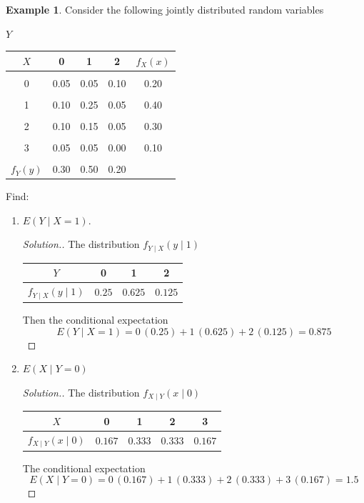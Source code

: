 \documentclass[12pt,a4paper]{report}
\theoremstyle{definition}
\newtheorem{example}[thm]{Example}
\theoremstyle{plain}
\theoremstyle{definition}
\begin{document}
\begin{example}
Consider the following jointly distributed random variables

\begin{table}[H]
\centering
$Y$\\
\begin{tabular}{c|ccc|c}
$X$ & 0 & 1 & 2 & $f_X(x)$\\
\hline
&&&&\\
0 & 0.05 & 0.05 & 0.10 & 0.20\\
&&&&\\
1 & 0.10 & 0.25 & 0.05 & 0.40\\
&&&&\\
2 & 0.10 & 0.15 & 0.05 & 0.30\\
&&&&\\
3 & 0.05 & 0.05 & 0.00 & 0.10\\
&&&&\\
\hline 
$f_Y(y)$ & 0.30 & 0.50  & 0.20 & \\
\end{tabular}
\end{table}
Find:
\begin{enumerate}
\item[(a).] $E(Y\mid X=1).$
\begin{proof}[\textit{Solution.}]
The distribution $f_{Y\mid X}(y\mid 1)$
       
\begin{table}[H]
\centering
\begin{tabular}{c|ccc}
$Y$ & 0 & 1 & 2\\
\hline
$f_{Y\mid X}(y\mid 1)$ & $0.25$ & $0.625$ & $0.125$\\
\end{tabular}
\end{table} 
Then the conditional expectation \[E(Y\mid X=1) = 0\,(0.25) +1\,(0.625) + 2\, (0.125) = 0.875\]    
\end{proof}

\item[(b).] $E(X\mid Y=0)$
\begin{proof}[\textit{Solution}.]
The distribution 
$f_{X\mid Y}(x\mid 0)$
        
\begin{table}[H]
\centering
\begin{tabular}{c|cccc}
$X$ & 0 & 1 & 2 & 3\\
\hline 
$f_{X\mid Y}(x\mid 0)$ & $0.167$ & $0.333$ & $0.333$ & $0.167$\\
\end{tabular}
\end{table} 
The conditional expectation
\[E(X\mid Y=0) = 0\, (0.167) +1\, (0.333) + 2\, (0.333) +3\, (0.167) = 1.5\]
\end{proof}
\end{enumerate}
\end{example}
\end{document}

